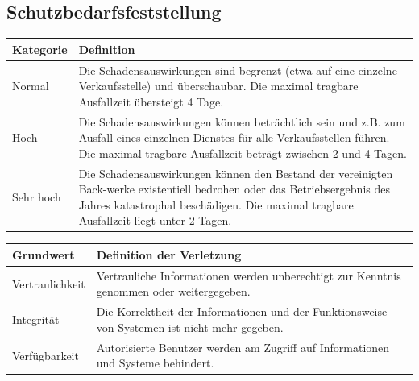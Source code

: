\subsection{Schutzbedarfsfeststellung}
\label{subsec:schutzbedarfsfeststellung}
\begin{minipage}{\textwidth}
\begin{center}
\begin{tabular}{lp{14cm}}
\toprule
Kategorie & Definition \\
\midrule
Normal & Die Schadensauswirkungen sind begrenzt (etwa auf eine einzelne Verkaufsstelle) und überschaubar. \newline Die maximal tragbare Ausfallzeit übersteigt 4 Tage.\\[0.3cm]
Hoch & Die Schadensauswirkungen können beträchtlich sein und z.B. zum Ausfall eines einzelnen Dienstes für alle Verkaufsstellen führen. \newline Die maximal tragbare Ausfallzeit beträgt zwischen 2 und 4 Tagen. \\[0.3cm]
Sehr hoch & Die Schadensauswirkungen können den Bestand der vereinigten Back-werke existentiell bedrohen oder das Betriebsergebnis des Jahres katastrophal beschädigen. \newline Die maximal tragbare Ausfallzeit liegt unter 2 Tagen. \\
\bottomrule
\end{tabular}
\end{center}
\end{minipage}
\bigskip

\begin{minipage}{\textwidth}
\begin{center}
\begin{tabular}{lp{14cm}}
\toprule
Grundwert & Definition der Verletzung \\
\midrule
Vertraulichkeit & Vertrauliche Informationen werden unberechtigt zur Kenntnis genommen oder weitergegeben. \\
Integrität & Die Korrektheit der Informationen und der Funktionsweise von Systemen ist nicht mehr gegeben. \\
Verfügbarkeit & Autorisierte Benutzer werden am Zugriff auf Informationen und Systeme behindert. \\
\bottomrule
\end{tabular}
\end{center}
\end{minipage}

